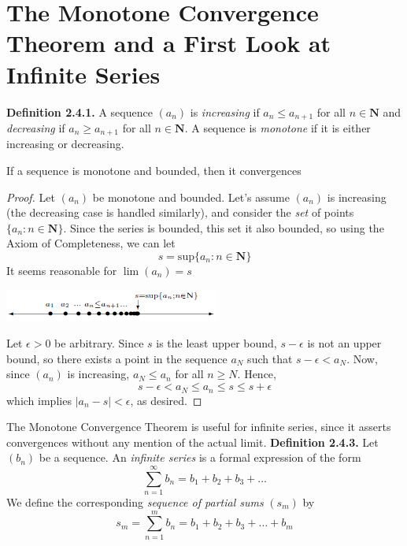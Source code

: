 \section{The Monotone Convergence Theorem and a First Look at Infinite Series}
    \textbf{Definition 2.4.1.} A sequence $(a_n)$ is \textit{increasing} if $a_n \leq a_{n+1}$ for all $n \in \textbf{N}$ and \textit{decreasing} if $a_n \geq a_{n+1}$ for all $n \in \textbf{N}$. A sequence is \textit{monotone} if it is either increasing or decreasing.
    \setcounter{theorem}{1}
    \begin{theorem}
        If a sequence is monotone and bounded, then it convergences
    \end{theorem}
    \begin{proof}
        Let $(a_n)$ be monotone and bounded. Let's assume $(a_n)$ is increasing (the decreasing case is handled similarly), and consider the \textit{set} of points $\{a_n: n \in \textbf{N}\}$. Since the series is bounded, this set it also bounded, so using the Axiom of Completeness, we can let
        $$s = \text{sup}\{a_n: n\in\textbf{N}\}$$
        It seems reasonable for $\lim(a_n) = s$
        \begin{center}
            \includegraphics[width=200pt]{sup.png}
        \end{center}
        Let $\epsilon > 0$ be arbitrary. Since $s$ is the least upper bound, $s - \epsilon$ is not an upper bound, so there exists a point in the sequence $a_N$ such that $s - \epsilon < a_N$. Now, since $(a_n)$ is increasing, $a_N \leq a_n$ for all $n \geq N$. Hence,
        $$s - \epsilon < a_N \leq a_n \leq s \leq s + \epsilon$$
        which implies $|a_n - s| < \epsilon$, as desired.
    \end{proof}
    The Monotone Convergence Theorem is useful for infinite series, since it asserts convergences without any mention of the actual limit.
    \textbf{Definition 2.4.3.} Let $(b_n)$ be a sequence. An \textit{infinite series} is a formal expression of the form
    \begin{equation*}
        \sum_{n=1}^\infty b_n = b_1 + b_2 + b_3 + \dots
    \end{equation*}
    We define the corresponding \textit{sequence of partial sums} $(s_m)$ by 
    \begin{equation*}
        s_m = \sum_{n=1}^m b_n = b_1 + b_2 + b_3 + \dots + b_m
    \end{equation*}
